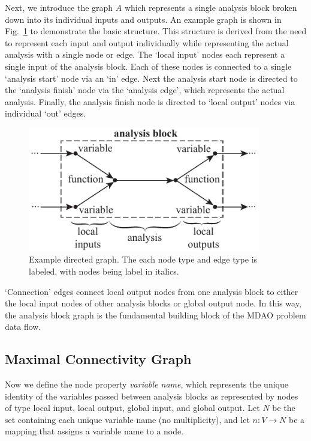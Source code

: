 Next, we introduce the graph $A$ which represents a single analysis block broken down into its individual inputs and outputs. An example graph is shown in Fig.~\ref{f:analysis block} to demonstrate the basic structure. This structure is derived from the need to represent each input and output individually while representing the actual analysis with a single node or edge. The `local input' nodes each represent a single input of the analysis block. Each of these nodes is connected to a single `analysis start' node via an `in' edge. Next the analysis start node is directed to the `analysis finish' node via the `analysis edge', which represents the actual analysis. Finally, the analysis finish node is directed to `local output' nodes via individual `out' edges.
\begin{figure}[htb!]
	\begin{center}
	\includegraphics[width=4in]{images/analysis_block}
	\end{center}
	\vspace{-20pt}
\caption{Example directed graph. The each node type and edge type is labeled, with nodes being label in italics.}
\label{f:analysis block}
\end{figure}
`Connection' edges connect local output nodes from one analysis block to either the local input nodes of other analysis blocks or global output node. In this way, the analysis block graph is the fundamental building block of the MDAO problem data flow.

\subsection{Maximal Connectivity Graph}
Now we define the node property \emph{variable name}, which represents the unique identity of the variables passed between analysis blocks as represented by nodes of type local input, local output, global input, and global output. Let $N$ be the set containing each unique variable name (no multiplicity), and let $n:V \to N$ be a mapping that assigns a variable name to a node.

